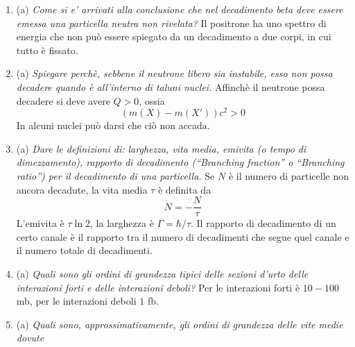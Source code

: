\documentclass{article}
\renewcommand{\a}{(a)}
\renewcommand{\t}[1]{\textit{ #1}}
\begin{document}
\begin{enumerate}
\begin{itemize}
	\item Decadimento $\alpha$:
	\[\tensor*[^A_Z]{X}{_N}\to\tensor*[^{A-4}_{Z-2}]{Y}{_{N-2}}+\tensor*[^4_2]{\textrm{He}}{_2}\]
	\item Decadimento $\beta^+$:
	\[\tensor*[^A_Z]{X}{_N}\to\tensor*[^{A}_{Z-1}]{Y}{_{N+1}}+e^++\nu_e\]
	All'interno del nucleo di fatto si ha
	\[p\to n+e^++\nu_e\]
	Il $Q$-valore è
	\[Q=(m_p-m_n-m_{e}-m_\nu)c^2=-1.804\textrm{ MeV}\]
	\item Decadimento $\beta^-$:
	\[\tensor*[^A_Z]{X}{_N}\to\tensor*[^{A}_{Z+1}]{Y}{_{N-1}}+e^-+\bar{\nu}_e\]
	All'interno del nucleo di fatto si ha
	\[n\to p+e^-+\bar{\nu}_e\]
	Il $Q$-valore è
	\[Q=(m_n-m_p-m_{e}-m_\nu)c^2=0.782\textrm{ MeV}\]
	\item Decadimento $\gamma$:
	\[\tensor*[^A_Z]{X}{^*_N}\to\tensor*[^{A}_{Z}]{X}{_{N}}+\gamma\]
	\item Cattura elettronica:
	\[\tensor*[^A_Z]{X}{_N}+e^-\to\tensor*[^{A}_{Z-1}]{Y}{_{N+1}}+\nu_e\]
	All'interno del nucleo di fatto si ha
	\[p+e^-\to n+{\nu}_e\]
	Il $Q$-valore è
	\[Q=(m_p+m_e-m_{n}-m_\nu)c^2=-0.782\textrm{ MeV}\]
\end{itemize}
\item\a\t{Come si e' arrivati alla conclusione che nel decadimento beta deve essere emessa
	una particella neutra non rivelata?} Il positrone ha uno spettro di energia che non può essere spiegato da un decadimento a due corpi, in cui tutto è fissato.
\item\a\t{Spiegare perchè, sebbene il neutrone libero sia instabile, esso non possa decadere
	quando è all'interno di taluni nuclei.} Affinchè il neutrone possa decadere si deve avere $Q>0$, ossia
	\[(m(X)-m(X'))c^2>0\]
	In alcuni nuclei può darsi che ciò non accada.
\item\a\t{Dare le definizioni di: larghezza, vita media, emivita (o tempo di dimezzamento),
	rapporto di decadimento (“Branching fraction” o “Branching ratio”) per il
	decadimento di una particella.} Se $N$ è il numero di particelle non ancora decadute, la vita media $\tau$ è definita da \[\dot{N}=-\frac{N}{\tau}\] L'emivita è $\tau\ln 2$, la larghezza è $\Gamma=\hbar/\tau$. Il rapporto di decadimento di un certo canale è il rapporto tra il numero di decadimenti che segue quel canale e il numero totale di decadimenti.
\item\a\t{Quali sono gli ordini di grandezza tipici delle sezioni d’urto delle interazioni forti
	e delle interazioni deboli?} Per le interazioni forti è $10-100$ mb, per le interazioni deboli $1$ fb.
\item\a\t{Quali sono, approssimativamente, gli ordini di grandezza delle vite medie dovute
}
\end{enumerate}
\end{document}
